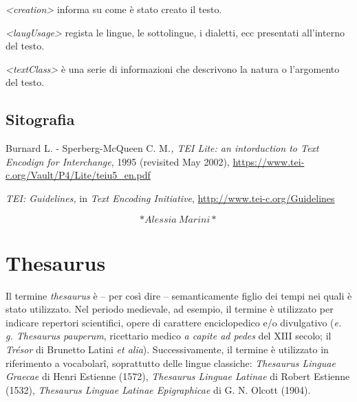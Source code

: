 \documentclass[
  b5paper,
  twoside,
  12pt,
  chapterprefix=false,
  bibliography=totocnumbered,
  parskip=false]{scrbook}
\begin{document}
\emph{\textless creation\textgreater{}} informa su come è stato creato il testo.

\emph{\textless laugUsage\textgreater{}} regista le lingue, le sottolingue, i dialetti, ecc
presentati all'interno del testo.

\emph{\textless textClass\textgreater{}} è una serie di informazioni che descrivono la natura o
l'argomento del testo.

\hypertarget{sitografia-31}{%
\section*{Sitografia}\label{sitografia-31}}

Burnard L. - Sperberg-McQueen C. M\emph{., TEI Lite: an intorduction to Text
Encodign for Interchange}, 1995 (revisited May 2002),
\url{https://www.tei-c.org/Vault/P4/Lite/teiu5_en.pdf}

\emph{TEI: Guidelines,} in \emph{Text Encoding Initiative},
\url{http://www.tei-c.org/Guidelines}

\[*Alessia~Marini*\]

\hypertarget{thesaurus}{%
\chapter{Thesaurus}\label{thesaurus}}

Il termine \emph{thesaurus} è -- per così dire -- semanticamente figlio dei
tempi nei quali è stato utilizzato. Nel periodo medievale, ad esempio,
il termine è utilizzato per indicare repertori scientifici, opere di
carattere enciclopedico e/o divulgativo (\emph{e. g. Thesaurus pauperum},
ricettario medico \emph{a capite ad pedes} del XIII secolo; il \emph{Trésor} di
Brunetto Latini \emph{et alia}). Successivamente, il termine è utilizzato in
riferimento a vocabolarî, soprattutto delle lingue classiche: \emph{Thesaurus
Linguae Graecae} di Henri Estienne (1572), \emph{Thesaurus Linguae Latinae}
di Robert Estienne (1532), \emph{Thesaurus Linguae Latinae Epigraphicae} di
G. N. Olcott (1904).
\end{document}
